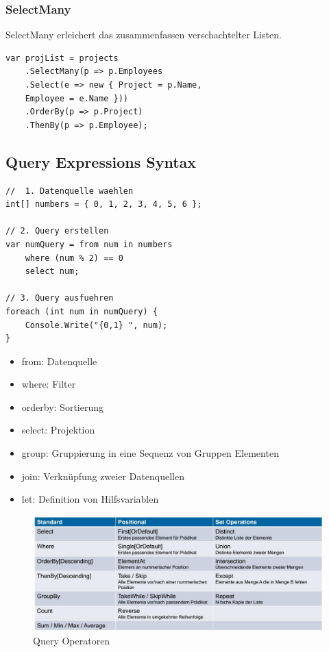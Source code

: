 \clearpage

\subsubsection{SelectMany}
SelectMany erleichert das zusammenfassen verschachtelter Listen. 
\begin{lstlisting}
var projList = projects
	.SelectMany(p => p.Employees
	.Select(e => new { Project = p.Name, 
	Employee = e.Name }))
	.OrderBy(p => p.Project)
	.ThenBy(p => p.Employee);
\end{lstlisting}

\clearpage

\subsection{Query Expressions Syntax}
\begin{lstlisting}
//  1. Datenquelle waehlen
int[] numbers = { 0, 1, 2, 3, 4, 5, 6 };

// 2. Query erstellen
var numQuery = from num in numbers
	where (num % 2) == 0
	select num;

// 3. Query ausfuehren
foreach (int num in numQuery) {
	Console.Write("{0,1} ", num);
}
\end{lstlisting}

\begin{itemize}
	\item from: Datenquelle
	\item where: Filter
	\item orderby: Sortierung
	\item select: Projektion
	\item group:  Gruppierung in eine Sequenz von Gruppen Elementen
	\item join: Verknüpfung zweier Datenquellen
	\item let: Definition von Hilfsvariablen
\end{itemize}

\begin{figure}[h]
\centering
\includegraphics[width=\linewidth]{images/linq_query_operatoren}
\caption{Query Operatoren}
\label{fig:linqqueryoperatoren}
\end{figure}

